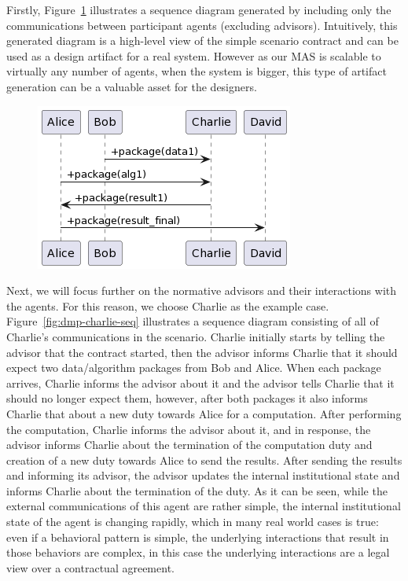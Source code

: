 Firstly, Figure~\ref{fig:dmp-seq} illustrates a sequence diagram generated by including only the communications between participant agents (excluding advisors). Intuitively, this generated diagram is a high-level view of the simple scenario contract and can be used as a design artifact for a real system. However as our MAS is scalable to virtually any number of agents, when the system is bigger, this type of artifact generation can be a valuable asset for the designers.

\begin{figure}[!tbh]
\centering
\includegraphics[width=.5\textwidth]{ch_cmf/market-sequence.png}
  \label{fig:dmp-seq}
\end{figure}

Next, we will focus further on the normative advisors and their interactions with the agents. For this reason, we choose Charlie as the example case. Figure~\ref{fig:dmp-charlie-seq} illustrates a sequence diagram consisting of all of Charlie's communications in the scenario. Charlie initially starts by telling the advisor that the contract started, then the advisor informs Charlie that it should expect two data/algorithm packages from Bob and Alice. When each package arrives, Charlie informs the advisor about it and the advisor tells Charlie that it should no longer expect them, however, after both packages it also informs Charlie that about a new duty towards Alice for a computation. After performing the computation, Charlie informs the advisor about it, and in response, the advisor informs Charlie about the termination of the computation duty and creation of a new duty towards Alice to send the results. After sending the results and informing its advisor, the advisor updates the internal institutional state and informs Charlie about the termination of the duty. As it can be seen, while the external communications of this agent are rather simple, the internal institutional state of the agent is changing rapidly, which in many real world cases is true: even if a behavioral pattern is simple, the underlying interactions that result in those behaviors are complex, in this case the underlying interactions are a legal view over a contractual agreement.

